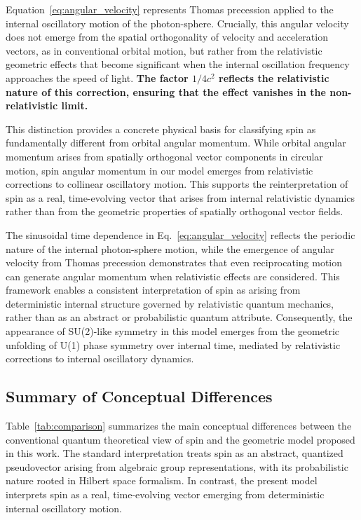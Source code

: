 \documentclass[%
 reprint,
 amsmath,amssymb,
 aps,
]{revtex4-1}
\numberwithin{equation}{section}%
\begin{document}
Equation~\ref{eq:angular_velocity} represents Thomas precession applied to the internal oscillatory motion of the photon-sphere. Crucially, this angular velocity does not emerge from the spatial orthogonality of velocity and acceleration vectors, as in conventional orbital motion, but rather from the relativistic geometric effects that become significant when the internal oscillation frequency approaches the speed of light. \textbf{The factor $1/4c^2$ reflects the relativistic nature of this correction, ensuring that the effect vanishes in the non-relativistic limit.}

This distinction provides a concrete physical basis for classifying spin as fundamentally different from orbital angular momentum. While orbital angular momentum arises from spatially orthogonal vector components in circular motion, spin angular momentum in our model emerges from relativistic corrections to collinear oscillatory motion. This supports the reinterpretation of spin as a real, time-evolving vector that arises from internal relativistic dynamics rather than from the geometric properties of spatially orthogonal vector fields.

The sinusoidal time dependence in Eq.~\ref{eq:angular_velocity} reflects the periodic nature of the internal photon-sphere motion, while the emergence of angular velocity from Thomas precession demonstrates that even reciprocating motion can generate angular momentum when relativistic effects are considered. This framework enables a consistent interpretation of spin as arising from deterministic internal structure governed by relativistic quantum mechanics, rather than as an abstract or probabilistic quantum attribute. Consequently, the appearance of SU(2)-like symmetry in this model emerges from the geometric unfolding of U(1) phase symmetry over internal time, mediated by relativistic corrections to internal oscillatory dynamics.


\subsection{Summary of Conceptual Differences}

Table~\ref{tab:comparison} summarizes the main conceptual differences between the conventional quantum theoretical view of spin and the geometric model proposed in this work. The standard interpretation treats spin as an abstract, quantized pseudovector arising from algebraic group representations, with its probabilistic nature rooted in Hilbert space formalism. In contrast, the present model interprets spin as a real, time-evolving vector emerging from deterministic internal oscillatory motion. 
\end{document}
